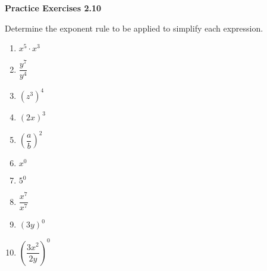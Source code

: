 \vspace{1ex}
\noindent\textbf{Practice Exercises 2.10}

\vspace{0.75ex}

Determine the exponent rule to be applied to simplify each expression.
\begin{multicols}{2}
\begin{enumerate}[noitemsep, label = \color{blue}\arabic*. ]
    \item  \( x^5 \cdot x^3 \)
    \item  \( \dfrac{y^7}{y^4} \)
    \item  \( (z^3)^4 \)
    \item  \( (2x)^3 \)
    \item  \( \left( \dfrac{a}{b} \right)^2 \)
    \item  \( x^0 \)
    \item  \( 5^0 \)
    \item  \( \dfrac{x^7}{x^7} \)
    \item  \( (3y)^0 \)
    \item  \( \left( \dfrac{3x^2}{2y} \right)^0 \)
\end{enumerate}
\end{multicols}
